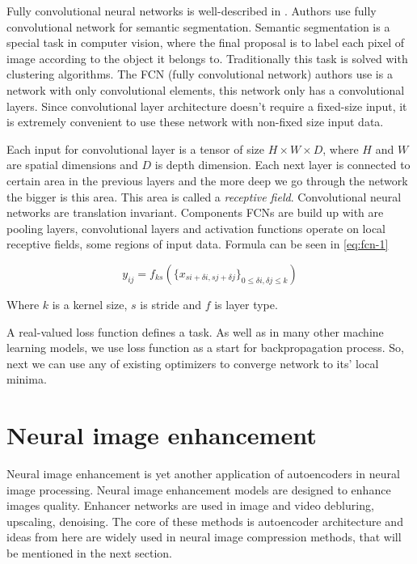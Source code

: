Fully convolutional neural networks is well-described in \cite{fcn}. Authors use fully convolutional network for semantic segmentation. Semantic segmentation is a special task in computer vision, where the final proposal is to label each pixel of image according to the object it belongs to. Traditionally this task is solved with clustering algorithms. The FCN (fully convolutional network) authors use is a network with only convolutional elements, this network only has a convolutional layers. Since convolutional layer architecture doesn't require a fixed-size input, it is extremely convenient to use these network with non-fixed size input data.

Each input for convolutional layer is a tensor of size $H \times W \times D$, where $H$ and $W$ are spatial dimensions and $D$ is depth dimension. Each next layer is connected to certain area in the previous layers and the more deep we go through the network the bigger is this area. This area is called a \textit{receptive field}. Convolutional neural networks are translation invariant. Components FCNs are build up with are pooling layers, convolutional layers and activation functions operate on local receptive fields, some regions of input data. Formula can be seen in \ref{eq:fcn-1}

\begin{equation}
    \label{eq:fcn-1}
    y_{ij} = f_{ks}(\{ x_{si + \delta i, sj + \delta j} \}_{0 \le \delta i, \delta j \le k})
\end{equation}

Where $k$ is a kernel size, $s$ is stride and $f$ is layer type.

A real-valued loss function defines a task. As well as in many other machine learning models, we use loss function as a start for backpropagation process. So, next we can use any of existing optimizers to converge network to its' local minima.

\section{Neural image enhancement}

Neural image enhancement is yet another application of autoencoders in neural image processing. Neural image enhancement models are designed to enhance images quality. Enhancer networks are used in image and video debluring, upscaling, denoising. The core of these methods is autoencoder architecture and ideas from here are widely used in neural image compression methods, that will be mentioned in the next section.

